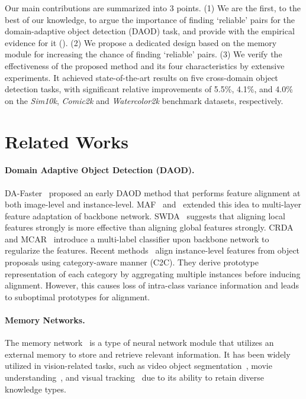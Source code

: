 \documentclass{bmvc2k}
\begin{document}
Our main contributions are summarized into 3 points. 
(1) We are the first, to the best of our knowledge, to argue the importance of finding `reliable' pairs for the domain-adaptive object detection (DAOD) task, and provide with the empirical evidence for it ().
(2) We propose a dedicated design based on the memory module for increasing the chance of finding `reliable' pairs.
(3) We verify the effectiveness of the proposed method and its four characteristics by extensive experiments.
It achieved state-of-the-art results on five cross-domain object detection tasks, with significant relative improvements of 5.5\%, 4.1\%, and 4.0\% on the \textit{Sim10k}, \textit{Comic2k} and \textit{Watercolor2k} benchmark datasets, respectively.













\section{Related Works}
\label{sec:related}



\paragraph{Domain Adaptive Object Detection (DAOD).} DA-Faster~\cite{chen2018domain} proposed an early DAOD method that performs feature alignment at both
image-level and instance-level. MAF~\cite{he2019multi} and~\cite{xie2019multi} extended this idea to multi-layer feature adaptation of backbone network. SWDA~\cite{saito2019strong} suggests that aligning local features strongly is more effective than aligning global features strongly. CRDA~\cite{xu2020exploring} and MCAR~\cite{zhao2020adaptive} introduce a multi-label classifier upon backbone network to regularize the features. Recent methods~\cite{xu2020cross, he2020domain, li2020spatial, zhang2021rpn, vs2021mega, su2020adapting, zhu2019adapting} align instance-level features from object proposals using category-aware manner (C2C). They derive prototype representation of each category by aggregating multiple instances before inducing alignment. However, this causes loss of intra-class variance information and leads to suboptimal prototypes for alignment.
\paragraph{Memory Networks.}
The memory network~\cite{weston2014memory, sukhbaatar2015end} is a type of neural network module that utilizes an external memory to store and retrieve relevant information. It has been widely utilized in vision-related tasks, such as video object segmentation~\cite{rodriguez2019domain, oh2019video}, movie understanding~\cite{na2017read}, and visual tracking~\cite{yang2018learning} due to its ability to retain diverse knowledge types.
\end{document}
